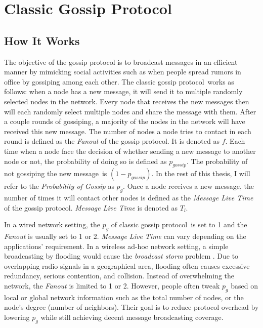 \documentclass[onehalf,11pt]{beavtex}
\newcommand{\gp}{gossip protocol}
\newcommand{\pog}{Probability of Gossip}
\newcommand{\msg}{message}
\begin{document}
\section{Classic Gossip Protocol}
\subsection{How It Works} \label{basic gossip}

The objective of the gossip protocol is to broadcast messages in an efficient manner by mimicking social activities such as when people spread rumors in office by gossiping among each other. The classic \gp ~works as follows: when a node has a new message, it will send it to multiple randomly selected nodes in the network. Every node that receives the new messages then will each randomly select multiple nodes and share the message with them. After a couple rounds of gossiping, a majority of the nodes in the network will have received this new message. The number of nodes a node tries to contact in each round is defined as the \emph{Fanout} of the \gp. It is denoted as $f$. Each time when a node face the decision of whether sending a new message to another node or not, the probability of doing so is defined as $p_{gossip}$. The probability of not gossiping the new \msg ~is $(1-p_{gossip})$. In the rest of this thesis, I will refer to the \emph{\pog} as $p_g$. Once a node receives a new message, the number of times it will contact other nodes is defined as the \emph{Message Live Time} of the \gp. \emph{Message Live Time} is denoted as $T_l$.

In a wired network setting, the $p_g$ of classic \gp ~is set to 1 and the \emph{Fanout} is usually set to 1 or 2. \emph{Message Live Time} can vary depending on the applications' requirement. In a wireless ad-hoc network setting, a simple broadcasting by flooding would cause the \emph{broadcast storm} problem \cite{tseng2002broadcast}. Due to overlapping radio signals in a geographical area, flooding often causes excessive redundancy, serious contention, and collision. Instead of overwhelming the network, the \emph{Fanout} is limited to 1 or 2. However, people often tweak $p_g$ based on local or global network information such as the total number of nodes, or the node's degree (number of neighbors). Their goal is to reduce protocol overhead by lowering $p_g$ while still achieving decent message broadcasting coverage. 

\end{document}
